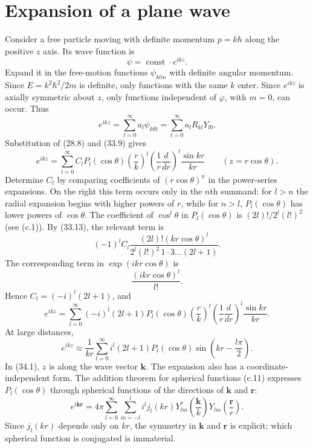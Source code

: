 \section{Expansion of a plane wave}

Consider a free particle moving with definite momentum $p=k\hbar$ along the
positive $z$ axis. Its wave function is
\[
 \psi=\operatorname{const}\cdot e^{ikz}.
\]
Expand it in the free-motion functions $\psi_{klm}$ with definite angular
momentum. Since $E=k^2\hbar^2/2m$ is definite, only functions with the same
$k$ enter. Since $e^{ikz}$ is axially symmetric about $z$, only functions
independent of $\varphi$, with $m=0$, can occur. Thus
\[
 e^{ikz}=\sum_{l=0}^{\infty}a_l\psi_{kl0}
 =\sum_{l=0}^{\infty}a_lR_{kl}Y_{l0}.
\]
Substitution of (28.8) and (33.9) gives
\[
 e^{ikz}=\sum_{l=0}^{\infty}C_lP_l(\cos\theta)
 \left(\frac rk\right)^l
 \left(\frac1r\frac d{dr}\right)^l\frac{\sin kr}{kr}
 \qquad(z=r\cos\theta).
\]
Determine $C_l$ by comparing coefficients of $(r\cos\theta)^n$ in the
power-series expansions. On the right this term occurs only in the $n$th
summand: for $l>n$ the radial expansion begins with higher powers of $r$,
while for $n>l$, $P_l(\cos\theta)$ has lower powers of $\cos\theta$. The
coefficient of $\cos^l\theta$ in $P_l(\cos\theta)$ is
$(2l)!/2^l(l!)^2$ (see (c.1)). By (33.13), the relevant term is
\[
 (-1)^lC_l\frac{(2l)!(kr\cos\theta)^l}
 {2^l(l!)^2\,1\cdot3\ldots(2l+1)}.
\]
The corresponding term in $\exp(ikr\cos\theta)$ is
\[
 \frac{(ikr\cos\theta)^l}{l!}.
\]
Hence $C_l=(-i)^l(2l+1)$, and
\begin{equation}
 e^{ikz}=\sum_{l=0}^{\infty}(-i)^l(2l+1)P_l(\cos\theta)
 \left(\frac rk\right)^l
 \left(\frac1r\frac d{dr}\right)^l\frac{\sin kr}{kr}.
 \tag{34.1}
\end{equation}
At large distances,
\begin{equation}
 e^{ikz}\approx\frac1{kr}\sum_{l=0}^{\infty}i^l(2l+1)
 P_l(\cos\theta)\sin\left(kr-\frac{l\pi}{2}\right).
 \tag{34.2}
\end{equation}
In (34.1), $z$ is along the wave vector $\mathbf k$. The expansion also has a
coordinate-independent form. The addition theorem for spherical functions
(c.11) expresses $P_l(\cos\theta)$ through spherical functions of the
directions of $\mathbf k$ and $\mathbf r$:
\begin{equation}
 e^{i\mathbf k\mathbf r}=4\pi\sum_{l=0}^{\infty}\sum_{m=-l}^{l}
 i^lj_l(kr)Y_{lm}^*\left(\frac{\mathbf k}{k}\right)
 Y_{lm}\left(\frac{\mathbf r}{r}\right).
 \tag{34.3}
\end{equation}
Since $j_l(kr)$ depends only on $kr$, the symmetry in $\mathbf k$ and
$\mathbf r$ is explicit; which spherical function is conjugated is immaterial.

